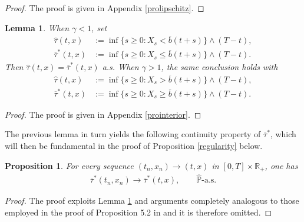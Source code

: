 \documentclass[a4paper,11pt]{amsart}
\numberwithin{equation}{section}
\newtheorem{lemma}{Lemma}[section]
\newtheorem{pro}{Proposition}[section]
\begin{document}
{{\begin{proof}
The proof is given in Appendix \ref{prolipschitz}.
\end{proof}
}

















{\color{black}
\begin{lemma}\label{interior}
When $\gamma<1$, set
\begin{align*}
\widehat\tau(t,x)&:=\inf\{s\geq0:X_s<\overline b(t+s)\}\wedge(T-t),\\
\overline\tau^\ast(t,x)&:=\inf\{s\geq0:X_s\leq\overline b(t+s)\}\wedge(T-t).
\end{align*}
Then $\widehat\tau(t,x)=\overline\tau^\ast(t,x)$ a.s. When $\gamma>1$, the same conclusion holds with
\begin{align*}
\widehat\tau(t,x)&:=\inf\{s\geq0:X_s>\overline b(t+s)\}\wedge(T-t),\\
\overline\tau^\ast(t,x)&:=\inf\{s\geq0:X_s\geq\overline b(t+s)\}\wedge(T-t).
\end{align*}
\end{lemma}

\begin{proof}
The proof is given in Appendix \ref{prointerior}.
\end{proof}

The previous lemma in turn yields the following continuity property of $\overline{\tau}^\ast$, which will then be fundamental in the proof of Proposition \ref{regularity} below. 

\begin{pro}\label{stopping}
For every sequence $(t_n,x_n)\to(t,x)$ in $[0,T]\times\mathbb R_+$, one has
\begin{align*}
\overline\tau^\ast(t_n,x_n)\longrightarrow\overline\tau^\ast(t,x),\qquad\widehat{\mathbb P}\text{-a.s.}
\end{align*}
\end{pro}

\begin{proof}
The proof exploits Lemma \ref{interior} and arguments completely analogous to those employed in the proof of Proposition 5.2 in \citet{de2017dividend} and it is therefore omitted.
\end{proof}

}}
\end{document}
